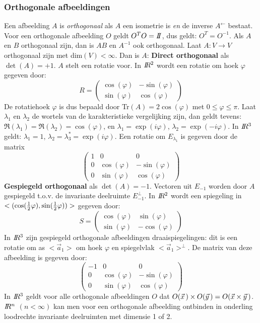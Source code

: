 \subsubsection{Orthogonale afbeeldingen}
Een afbeelding $A$ is {\it orthogonaal} als $A$ een isometrie is {\it en}
de inverse $A^\leftarrow$ bestaat. Voor een orthogonale afbeelding $O$ geldt
$O^TO=I\hspace{-1mm}I$, dus geldt: $O^T=O^{-1}$. Als $A$ en $B$ orthogonaal zijn, dan is
$AB$ en $A^{-1}$ ook orthogonaal.
\npar
Laat $A:V\rightarrow V$ orthogonaal zijn met dim$(V)<\infty$. Dan is $A$:
\npar
{\bf Direct orthogonaal} als $\det(A)=+1$. $A$ stelt een rotatie voor.
In $I\hspace{-1mm}R^2$ wordt een rotatie om hoek $\varphi$ gegeven door:
\[
R=
\left(\begin{array}{cc}
\cos(\varphi)&-\sin(\varphi)\\
\sin(\varphi)&\cos(\varphi)
\end{array}\right)
\]
De rotatiehoek $\varphi$ is dus bepaald door Tr$(A)=2\cos(\varphi)$ met
$0\leq\varphi\leq\pi$. Laat $\lambda_1$ en $\lambda_2$ de wortels van de
karakteristieke vergelijking zijn, dan geldt tevens:
$\Re(\lambda_1)=\Re(\lambda_2)=\cos(\varphi)$, en $\lambda_1=\exp(i\varphi)$,
$\lambda_2=\exp(-i\varphi)$.
\npar
In $I\hspace{-1mm}R^3$ geldt: $\lambda_1=1$, $\lambda_2=\lambda_3^*=\exp(i\varphi)$. Een
rotatie om $E_{\lambda_1}$ is gegeven door de matrix
\[
\left(\begin{array}{ccc}
1&0&0\\
0&\cos(\varphi)&-\sin(\varphi)\\
0&\sin(\varphi)&\cos(\varphi)
\end{array}\right)
\]
{\bf Gespiegeld orthogonaal} als $\det(A)=-1$. Vectoren uit $E_{-1}$ worden door
$A$ gespiegeld t.o.v. de invariante deelruimte $E^\perp_{-1}$. In $I\hspace{-1mm}R^2$ wordt
een spiegeling in $<(\cos(\mbox{$\frac{1}{2}$}\varphi),\sin(\mbox{$\frac{1}{2}$}\varphi))>$ gegeven door:
\[
S=
\left(\begin{array}{cc}
\cos(\varphi)&\sin(\varphi)\\
\sin(\varphi)&-\cos(\varphi)
\end{array}\right)
\]
In $I\hspace{-1mm}R^3$ zijn gespiegeld orthogonale afbeeldingen draaispiegelingen: dit is
een rotatie om as $<\vec{a}_1>$ om hoek $\varphi$ en spiegelvlak
$<\vec{a}_1>^\perp$. De matrix van deze afbeelding is gegeven door:
\[
\left(\begin{array}{ccc}
-1&0&0\\
0&\cos(\varphi)&-\sin(\varphi)\\
0&\sin(\varphi)&\cos(\varphi)
\end{array}\right)
\]
In $I\hspace{-1mm}R^3$ geldt voor alle orthogonale afbeeldingen $O$ dat
$O(\vec{x}\,)\times O(\vec{y}\,)=O(\vec{x}\times\vec{y}\,)$.
\npar
$I\hspace{-1mm}R^n$ $(n<\infty)$ kan men voor een orthogonale afbeelding ontbinden in
onderling loodrechte invariante deelruimten met dimensie 1 of 2.

